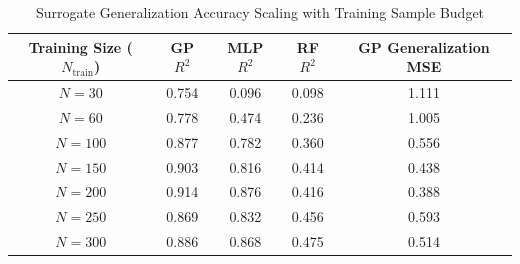 \begin{table}[t]
\centering
\caption{Surrogate Generalization Accuracy Scaling with Training Sample Budget}
\label{tab:surrogate_learning_curve}
\begin{tabular}{ccccc}
\hline
\textbf{Training Size ($N_{\text{train}}$)} & \textbf{GP $R^2$} & \textbf{MLP $R^2$} & \textbf{RF $R^2$} & \textbf{GP Generalization MSE} \\
\hline
$N = 30$ & 0.754 & 0.096 & 0.098 & 1.111 \\
$N = 60$ & 0.778 & 0.474 & 0.236 & 1.005 \\
$N = 100$ & 0.877 & 0.782 & 0.360 & 0.556 \\
$N = 150$ & 0.903 & 0.816 & 0.414 & 0.438 \\
$N = 200$ & 0.914 & 0.876 & 0.416 & 0.388 \\
$N = 250$ & 0.869 & 0.832 & 0.456 & 0.593 \\
$N = 300$ & 0.886 & 0.868 & 0.475 & 0.514 \\
\hline
\end{tabular}
\end{table}

